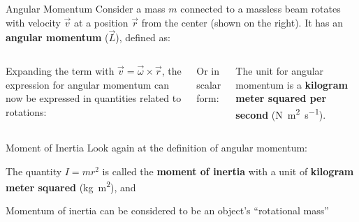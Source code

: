 \documentclass[12pt,compress,aspectratio=169]{beamer}
\begin{document}
\begin{frame}{Angular Momentum}
  Consider a mass $m$ connected to a massless beam rotates with velocity
  $\vec v$ at a position $\vec r$ from the center (shown on the right). It has
  an \textbf{angular momentum} ($\vec L$), defined as:
  \begin{columns}
    

    \vspace{-.1in}Expanding the term with $\vec v=\vec\omega\times\vec r$, the
    expression for angular momentum can now be expressed in quantities related
    to rotations:

    
    \vspace{-.2in}Or in scalar form:
    

    \vspace{-.2in}The unit for angular momentum is a
    \textbf{kilogram meter squared per second}
    (\si{\newton\metre\squared\per\second}).
    
  \end{columns}
\end{frame}



\begin{frame}{Moment of Inertia}
  Look again at the definition of angular momentum:
    
    
  The quantity $I=mr^2$ is called the \textbf{moment of inertia} with a unit of
  \textbf{kilogram meter squared} (\si{\kilo\gram\metre\squared}), and 


  Momentum of inertia can be considered to be an object's ``rotational mass''
\end{frame}
\end{document}
